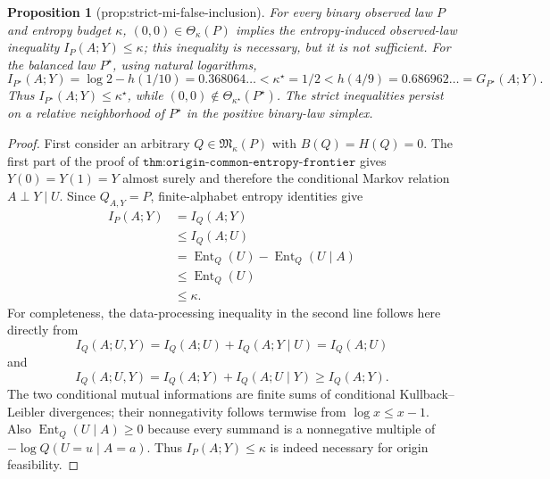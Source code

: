\documentclass{article}
\newtheorem{proposition}{Proposition}
\begin{document}
\begin{proposition}[prop:strict-mi-false-inclusion]\label{prop:strict-mi-false-inclusion}
For every binary observed law \(P\) and entropy budget \(\kappa\), \((0,0)\in\Theta_\kappa(P)\) implies the entropy-induced observed-law inequality \(I_P(A;Y)\leq\kappa\); this inequality is necessary, but it is not sufficient. For the balanced law \(P^\star\), using natural logarithms, \[I_{P^\star}(A;Y)=\log2-h(1/10)=0.368064\ldots<\kappa^\star=1/2<h(4/9)=0.686962\ldots=G_{P^\star}(A;Y).\] Thus \(I_{P^\star}(A;Y)\leq\kappa^\star\), while \((0,0)\notin\Theta_{\kappa^\star}(P^\star)\). The strict inequalities persist on a relative neighborhood of \(P^\star\) in the positive binary-law simplex.
\end{proposition}
\begin{proof}
First consider an arbitrary \(Q\in\mathfrak M_\kappa(P)\) with \(B(Q)=H(Q)=0\).  The first part of the proof of \(\texttt{thm:origin-common-entropy-frontier}\) gives \(Y(0)=Y(1)=Y\) almost surely and therefore the conditional Markov relation \(A\perp Y\mid U\).  Since \(Q_{A,Y}=P\), finite-alphabet entropy identities give
\[
\begin{aligned}
 I_P(A;Y)&=I_Q(A;Y)\\
 &\leq I_Q(A;U)\\
 &=\operatorname{Ent}_Q(U)-\operatorname{Ent}_Q(U\mid A)\\
 &\leq\operatorname{Ent}_Q(U)\\
 &\leq\kappa.
\end{aligned}
\]
For completeness, the data-processing inequality in the second line follows here directly from
\[
 I_Q(A;U,Y)=I_Q(A;U)+I_Q(A;Y\mid U)=I_Q(A;U)
\]
and
\[
 I_Q(A;U,Y)=I_Q(A;Y)+I_Q(A;U\mid Y)\geq I_Q(A;Y).
\]
The two conditional mutual informations are finite sums of conditional Kullback--Leibler divergences; their nonnegativity follows termwise from \(\log x\leq x-1\).  Also \(\operatorname{Ent}_Q(U\mid A)\geq0\) because every summand is a nonnegative multiple of \(-\log Q(U=u\mid A=a)\).  Thus \(I_P(A;Y)\leq\kappa\) is indeed necessary for origin feasibility.


\end{proof}
\end{document}
